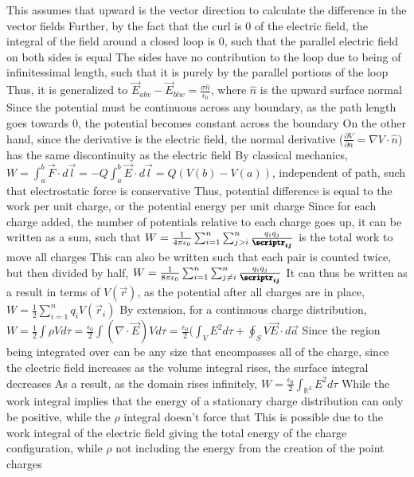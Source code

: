 \documentclass[11 pt, twoside]{article}
\newenvironment{outline*}
{
	\begin{outline}[enumerate]
	}
	{\end{outline}
}
\begin{document}
\begin{outline*}
	\2 This assumes that upward is the vector direction to calculate the difference in the vector fields
	\2 Further, by the fact that the curl is 0 of the electric field, the integral of the field around a closed loop is 0, such that the parallel electric field on both sides is equal
		\3 The sides have no contribution to the loop due to being of infinitessimal length, such that it is purely by the parallel portions of the loop
	\2 Thus, it is generalized to $\vec{E}_{abv} - \vec{E}_{blw} = \frac{\sigma \hat{n}}{\epsilon_0}$, where $\hat{n}$ is the upward surface normal
	\2 Since the potential must be continuous across any boundary, as the path length goes towards 0, the potential becomes constant across the boundary
		\3 On the other hand, since the derivative is the electric field, the normal derivative ($\frac{\partial V}{\partial n} = \nabla V \cdot \hat{n}$) has the same discontinuity as the electric field
\1 By classical mechanics, $W = \int^b_a \vec{F} \cdot d\vec{l} = -Q\int^b_a \vec{E} \cdot d\vec{l} = Q(V(b) - V(a))$, independent of path, such that electrostatic force is conservative
	\2 Thus, potential difference is equal to the work per unit charge, or the potential energy per unit charge
	\2 Since for each charge added, the number of potentials relative to each charge goes up, it can be written as a sum, such that $W = \frac{1}{4\pi\epsilon_0} \sum_{i = 1}^n \sum_{j > i}^n \frac{q_iq_j}{\pmb{\scriptr_{ij}}}$ is the total work to move all charges
		\3 This can also be written such that each pair is counted twice, but then divided by half, $W = \frac{1}{8\pi\epsilon_0} \sum_{i = 1}^n \sum_{j \neq i}^n \frac{q_iq_j}{\pmb{\scriptr_{ij}}}$
			\4 It can thus be written as a result in terms of $V(\vec{r})$, as the potential after all charges are in place, $W = \frac{1}{2}\sum_{i = 1}^n q_iV(\vec{r}_i)$
		\3 By extension, for a continuous charge distribution, $W = \frac{1}{2}\int \rho V d\tau = \frac{\epsilon_0}{2}\int (\nabla \cdot \vec{E})Vd\tau = \frac{\epsilon_0}{2}(\int_V E^2d\tau + \oint_S V\vec{E} \cdot d\vec{a}$
			\4 Since the region being integrated over can be any size that encompasses all of the charge, since the electric field increases as the volume integral rises, the surface integral decreases
			\4 As a result, as the domain rises infinitely, $W = \frac{\epsilon_0}{2}\int_{\mathbb{R}^3} E^2 d\tau$
	\2 While the work integral implies that the energy of a stationary charge distribution can only be positive, while the $\rho$ integral doesn't force that
		\3 This is possible due to the work integral of the electric field giving the total energy of the charge configuration, while $\rho$ not including the energy from the creation of the point charges

\end{outline*}
\end{document}
